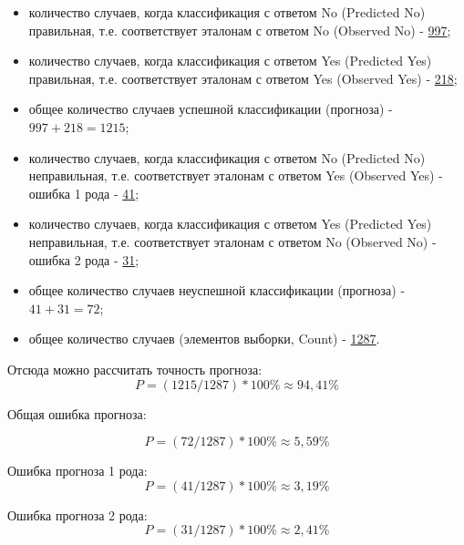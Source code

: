 \begin{itemize}
  \item количество случаев, когда классификация с ответом No (Predicted No) правильная,
  т.е. соответствует эталонам с ответом No (Observed No) - \underline{997};
  \item количество случаев, когда классификация с ответом Yes (Predicted Yes) правильная,
  т.е. соответствует эталонам с ответом Yes (Observed Yes) - \underline{218};
  \item общее количество случаев успешной классификации (прогноза) - \underline{$997+218=1215$};
  \item количество случаев, когда классификация с ответом No (Predicted No)
  неправильная, т.е. соответствует эталонам с ответом Yes (Observed Yes) - ошибка 1
  рода - \underline{41};
  \item количество случаев, когда классификация с ответом Yes (Predicted Yes)
  неправильная, т.е. соответствует эталонам с ответом No (Observed No) - ошибка 2
  рода - \underline{31};
  \item общее количество случаев неуспешной классификации (прогноза) - \underline{$41+31=72$};
  \item общее количество случаев (элементов выборки, Count) - \underline{1287}.
\end{itemize}


Отсюда можно рассчитать точность прогноза:
$$
P = (1215 / 1287) * 100\% \approx 94,41\%
$$

Общая ошибка прогноза:

$$
P = (72 / 1287) * 100\% \approx 5,59\%
$$

Ошибка прогноза 1 рода:
$$
P = (41 / 1287) * 100\% \approx 3,19\%
$$

Ошибка прогноза 2 рода:
$$
P = (31 / 1287) * 100\% \approx 2,41\%
$$

\newpage
